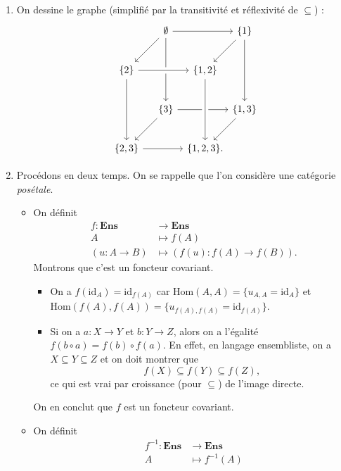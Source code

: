 \documentclass{../../td}
\begin{document}
  \begin{enumerate}
    \item On dessine le graphe (simplifié par la transitivité et réflexivité de $\subseteq$) :
      \[
        \begin{tikzcd}[row sep={40,between origins}, column sep={40,between origins}]
            & \emptyset \ar{rr}\ar{dd}\ar{dl} & & \{1\} \vphantom{\times_{S_1}} \ar{dd}\ar{dl} \\
          \{2\}  \ar[crossing over]{rr} \ar{dd} & & \{1,2\}  \\
            & \{3\}   \ar{rr} \ar{dl} & &  \{1,3\}  \ar{dl} \\
          \{2,3\}  \ar{rr} && \{1,2,3\}  \ar[from=uu,crossing over].
        \end{tikzcd}
      \]
    \item Procédons en deux temps. On se rappelle que l'on considère une catégorie \textit{posétale}.
      \begin{itemize}
        \item On définit 
          \begin{align*}
            f: \mathbf{Ens} &\longrightarrow \mathbf{Ens} \\
            A &\longmapsto f(A)\\ 
            (u: A \to B) &\longmapsto (f(u) : f(A) \to f(B))
          .\end{align*}
          Montrons que c'est un foncteur covariant.
          \begin{itemize}
            \item On a $f(\mathrm{id}_A) = \mathrm{id}_{f(A)}$ car $\mathrm{Hom}(A,A) = \{u_{A,A}=\mathrm{id}_A\}$ et $\mathrm{Hom}(f(A),f(A)) = \{u_{f(A),f(A)} = \mathrm{id}_{f(A)}\}$.
            \item Si on a $a : X \to Y$ et $b : Y \to Z$, alors 
              on a l'égalité~$f(b \circ a) = f(b) \circ f(a)$.
              En effet, en langage ensembliste, on a $X \subseteq Y\subseteq Z$ et on
              doit montrer que \[
              f(X) \subseteq f(Y) \subseteq f(Z)
              ,\] ce qui est vrai par croissance (pour $\subseteq$) de l'image directe.
          \end{itemize}
          On en conclut que $f$ est un foncteur covariant.
        \item On définit 
          \begin{align*}
            f^{-1}: \mathbf{Ens} &\longrightarrow \mathbf{Ens} \\
            A &\longmapsto f^{-1}(A)\\ 

\end{align*}
\end{itemize}
\end{enumerate}
\end{document}
